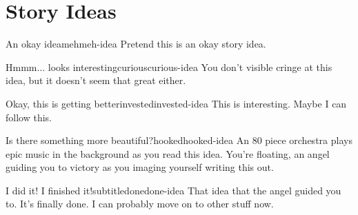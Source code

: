\chapter{Story Ideas}\label{fm:story-idea}

\begin{storyidea}{An okay idea}{}{meh}{meh-idea}
    Pretend this is an okay story idea.

    \blindtext
\end{storyidea}

\begin{storyidea}{Hmmm... looks interesting}{}{curious}{curious-idea}
    You don't visible cringe at this idea, but it doesn't seem that great either.

    \blindtext
\end{storyidea}

\begin{storyidea}{Okay, this is getting better}{}{invested}{invested-idea}
    This is interesting. Maybe I can follow this.

    \blindtext
\end{storyidea}

\begin{storyidea}{Is there something more beautiful?}{}{hooked}{hooked-idea}
    An 80 piece orchestra plays epic music in the background as you read this idea. You're floating, an angel guiding you to victory as you imaging yourself writing this out.

    \blindtext
\end{storyidea}

\begin{storyidea}{I did it! I finished it!}{subtitle}{done}{done-idea}
    That idea that the angel guided you to. It's finally done. I can probably move on to other stuff now.

    \blindtext
\end{storyidea}